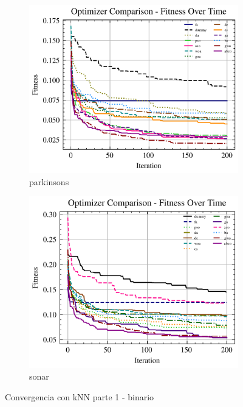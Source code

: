 \begin{figure}[htp]
    \begin{subfigure}[b]{0.45\textwidth}
        \includegraphics[width=\textwidth]{imagenes/fitness_charts/img/binary/parkinsons/optimizers_fitness_knn.png}
        \caption{parkinsons}
        \label{fig:convergencia_parkinsons_knn}
    \end{subfigure}
    \begin{subfigure}[b]{0.45\textwidth}
        \includegraphics[width=\textwidth]{imagenes/fitness_charts/img/binary/sonar/optimizers_fitness_knn.png}
        \caption{sonar}
        \label{fig:convergencia_sonar_knn}
    \end{subfigure}
    \caption{Convergencia con kNN parte 1 - binario}
    \label{fig:convergencia_knn_1}
\end{figure}

